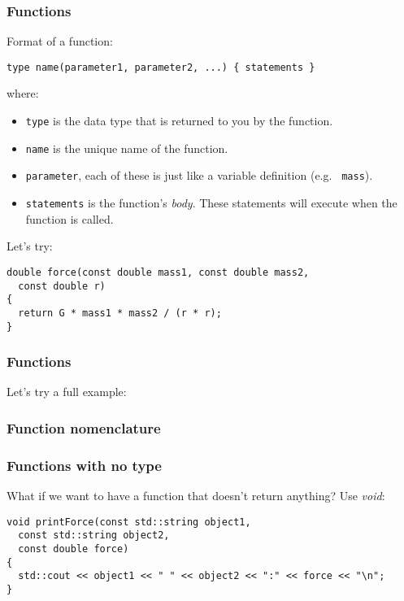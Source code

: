 \documentclass{beamer}
\begin{document}
\begin{frame}[fragile]
  \frametitle{Functions}

  Format of a function:
  \begin{lstlisting}
type name(parameter1, parameter2, ...) { statements }  
  \end{lstlisting}
  where:
  \begin{itemize}
    \item<2->{\texttt{type} is the data type that is returned to you by the function.}
    \item<3->{\texttt{name} is the unique name of the function.}
    \item<4->{\texttt{parameter}, each of these is just like a variable definition (e.g. \texttt{ mass}).}
    \item<5->{\texttt{statements} is the function's \textit{body}.  These statements will execute when the function is called.}
  \end{itemize}
  \pause[6]
  Let's try:
  \begin{lstlisting}
double force(const double mass1, const double mass2,
  const double r)
{
  return G * mass1 * mass2 / (r * r);
}
  \end{lstlisting}
\end{frame}


\begin{frame}[fragile]
  \frametitle{Functions}

  Let's try a full example:
  
\end{frame}

\begin{frame}
  \frametitle{Function nomenclature}
  
  
\end{frame}

\begin{frame}[fragile]
  \frametitle{Functions with no type}
  
  What if we want to have a function that doesn't return anything?\newline
  \pause
  Use \textit{void}:
  \begin{lstlisting}
void printForce(const std::string object1,
  const std::string object2,
  const double force)
{
  std::cout << object1 << " " << object2 << ":" << force << "\n";
}
  \end{lstlisting}
\end{frame}
\end{document}
